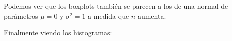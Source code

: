 \documentclass[a4paper]{article}
\begin{document}
	Podemos ver que los boxplots tambi\'en se parecen a los de una normal de par\'ametros $\mu = 0$ y $\sigma^2 = 1$ a medida que $n$ aumenta.
	
	Finalmente viendo los histogramas:
	
	\begin{figure}[H]
		\centering
		\hfill
	\end{figure}
	
\end{document}
